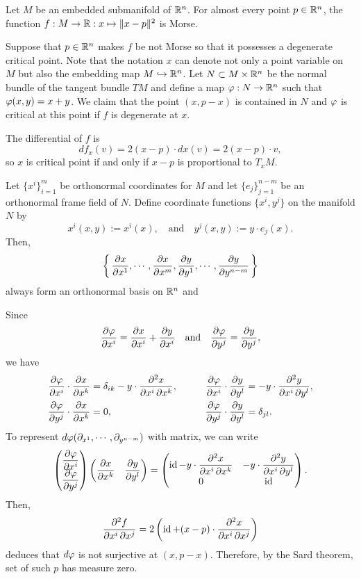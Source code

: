 \documentclass{../../large}
\begin{document}
\begin{prop}
Let $M$ be an embedded submanifold of $\mathbb{R}^n$.
For almost every point $p\in\mathbb{R}^n$, the function $f:M\to\mathbb{R}:x\mapsto\|x-p\|^2$ is Morse.
\end{prop}
\begin{pf}
Suppose that $p\in\mathbb{R}^n$ makes $f$ be not Morse so that it possesses a degenerate critical point.
Note that the notation $x$ can denote not only a point variable on $M$ but also the embedding map $M\hookrightarrow\mathbb{R}^n$.
Let $N\subset M\times\mathbb{R}^n$ be the normal bundle of the tangent bundle $TM$ and define a map $\varphi:N\to\mathbb{R}^n$ such that $\varphi(x,y)=x+y$.
We claim that the point $(x,p-x)$ is contained in $N$ and $\varphi$ is critical at this point if $f$ is degenerate at $x$.

The differential of $f$ is
\[df_x(v)=2(x-p)\cdot dx(v)=2(x-p)\cdot v,\]
so $x$ is critical point if and only if $x-p$ is proportional to $T_xM$.

Let $\{x^i\}_{i=1}^m$ be orthonormal coordinates for $M$ and let $\{e_j\}_{j=1}^{n-m}$ be an orthonormal frame field of $N$.
Define coordinate functions $\{x^i,y^j\}$ on the manifold $N$ by
\[x^i(x,y):=x^i(x),\quad\text{and}\quad y^j(x,y):=y\cdot e_j(x).\]
Then,
\[\left\{\,\pd{x}{x^1},\cdots,\pd{x}{x^m},\pd{y}{y^1},\cdots,\pd{y}{y^{n-m}}\,\right\}\]
always form an orthonormal basis on $\mathbb{R}^n$ and

Since
\[\pd{\f}{x^i}=\pd{x}{x^i}+\pd{y}{x^i}\quad\text{and}\quad\pd{\f}{y^j}=\pd{y}{y^j},\]
we have
\begin{alignat*}{2}
\pd{\f}{x^i}\cdot\pd{x}{x^k}&=\delta_{ik}-y\cdot\pd{x}{x^i}{x^k},\qquad&
\pd{\f}{x^i}\cdot\pd{y}{y^l}&=-y\cdot\pd{y}{x^i}{y^l},\\
\pd{\f}{y^j}\cdot\pd{x}{x^k}&=0,&
\pd{\f}{y^j}\cdot\pd{y}{y^l}&=\delta_{jl}.
\end{alignat*}
To represent $d\f(\pd_{x^1},\cdots,\pd_{y^{n-m}})$ with matrix, we can write
\[\begin{pmatrix}\displaystyle\pd{\f}{x^i}\\\displaystyle\pd{\f}{y^j}\end{pmatrix}
\begin{pmatrix}\displaystyle\pd{x}{x^k}&\displaystyle\pd{y}{y^l}\end{pmatrix}
=\begin{pmatrix}\displaystyle\id-y\cdot\pd{x}{x^i}{x^k}&\displaystyle-y\cdot\pd{y}{x^i}{y^l}\\0&\id\end{pmatrix}.\]
Then,
\[\pd{f}{x^i}{x^j}=2\left(\id+(x-p)\cdot\pd{x}{x^i}{x^j}\right)\]
deduces that $d\varphi$ is not surjective at $(x,p-x)$.
Therefore, by the Sard theorem, set of such $p$ has measure zero.
\end{pf}
\end{document}
